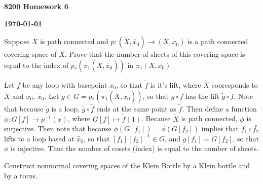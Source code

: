 \documentclass[12pt]{article}
\begin{document}
\begin{newtitle}
  \begin{center}
    \textbf{\Huge 8200 Homework 6}
  \end{center}
  \hfill \textbf{\today}
\end{newtitle}

\begin{statement}
  Suppose $X$ is path connected and $p: (\tilde{X},\tilde{x_0}) \to (X,x_0)$ is a path connected covering space of $X$. 
  Prove that the number of sheets of this covering space is equal to the index of $p_*(\pi_1(\tilde{X},\tilde{x_0}))$ 
  in $\pi_1(X,x_0)$.
\end{statement}

\begin{newproof}
  Let $f$ be any loop with basepoint $x_0$, so that $\tilde{f}$ is it's lift, where $X$ cooresponds to 
  $\tilde{X}$ and $x_0$, $\tilde{x_0}$. Let $g \in G=p_*(\pi_1(\tilde{X},\tilde{x_0}))$, so that $g \circ f$ has 
  the lift $\tilde{g} \circ \tilde{f}$. Note that because $\tilde{g}$ is a loop, $\tilde{g} \circ 
  \tilde{f}$ ends at the same point as $\tilde{f}$. Then define a function $\phi: G[f] \to p^{-1}(x)$, 
  where $G[f] \mapsto \tilde{f}(1)$. Because $\tilde{X}$ is path connected, $\phi$ is surjective. 
  Then note that because $\phi(G[f_1])=\phi(G[f_2])$ implies that $f_1 \circ \bar{f_2}$ 
  lifts to a loop based at $\tilde{x_0}$, so that $[f_1][f_2]^{-1} \in G$, and $g[f_1]=G[f_2]$, so 
  that $\phi$ is injective. Thus the number of cosets (index) is equal to the number of sheets. 
\end{newproof}

\begin{statement}
  Construct nonnormal covering spaces of the Klein Bottle by a Klein bottle and by a torus. 
\end{statement}

\begin{newproof}

\end{newproof}
\end{document}
